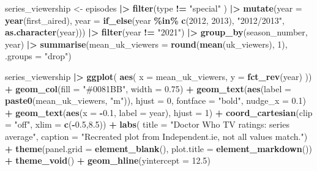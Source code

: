 \documentclass[
]{article}
\newenvironment{Shaded}{\begin{snugshade}}{\end{snugshade}}
\newcommand{\AttributeTok}[1]{\textcolor[rgb]{0.13,0.29,0.53}{#1}}
\newcommand{\DecValTok}[1]{\textcolor[rgb]{0.00,0.00,0.81}{#1}}
\newcommand{\FloatTok}[1]{\textcolor[rgb]{0.00,0.00,0.81}{#1}}
\newcommand{\FunctionTok}[1]{\textcolor[rgb]{0.13,0.29,0.53}{\textbf{#1}}}
\newcommand{\NormalTok}[1]{#1}
\newcommand{\OtherTok}[1]{\textcolor[rgb]{0.56,0.35,0.01}{#1}}
\newcommand{\SpecialCharTok}[1]{\textcolor[rgb]{0.81,0.36,0.00}{\textbf{#1}}}
\newcommand{\StringTok}[1]{\textcolor[rgb]{0.31,0.60,0.02}{#1}}
\begin{document}
\begin{Shaded}
\begin{Highlighting}[]
\NormalTok{series\_viewership }\OtherTok{\textless{}{-}}\NormalTok{ episodes }\SpecialCharTok{|\textgreater{}}
  \FunctionTok{filter}\NormalTok{(type }\SpecialCharTok{!=} \StringTok{"special"}\NormalTok{ ) }\SpecialCharTok{|\textgreater{}}
  \FunctionTok{mutate}\NormalTok{(}\AttributeTok{year =} \FunctionTok{year}\NormalTok{(first\_aired), }
         \AttributeTok{year =} \FunctionTok{if\_else}\NormalTok{(year }\SpecialCharTok{\%in\%} \FunctionTok{c}\NormalTok{(}\DecValTok{2012}\NormalTok{, }\DecValTok{2013}\NormalTok{), }\StringTok{"2012/2013"}\NormalTok{, }
                        \FunctionTok{as.character}\NormalTok{(year))) }\SpecialCharTok{|\textgreater{}}
  \FunctionTok{filter}\NormalTok{(year }\SpecialCharTok{!=} \StringTok{"2021"}\NormalTok{) }\SpecialCharTok{|\textgreater{}}
  \FunctionTok{group\_by}\NormalTok{(season\_number, year) }\SpecialCharTok{|\textgreater{}}
  \FunctionTok{summarise}\NormalTok{(}\AttributeTok{mean\_uk\_viewers =} \FunctionTok{round}\NormalTok{(}\FunctionTok{mean}\NormalTok{(uk\_viewers), }\DecValTok{1}\NormalTok{), }\AttributeTok{.groups =} \StringTok{"drop"}\NormalTok{) }

\NormalTok{series\_viewership }\SpecialCharTok{|\textgreater{}}
  \FunctionTok{ggplot}\NormalTok{(}
    \FunctionTok{aes}\NormalTok{(}
      \AttributeTok{x =}\NormalTok{ mean\_uk\_viewers, }\AttributeTok{y =} \FunctionTok{fct\_rev}\NormalTok{(year)}
\NormalTok{    )) }\SpecialCharTok{+} 
  \FunctionTok{geom\_col}\NormalTok{(}\AttributeTok{fill =} \StringTok{"\#0081BB"}\NormalTok{, }\AttributeTok{width =} \FloatTok{0.75}\NormalTok{) }\SpecialCharTok{+} 
  \FunctionTok{geom\_text}\NormalTok{(}\FunctionTok{aes}\NormalTok{(}\AttributeTok{label =} \FunctionTok{paste0}\NormalTok{(mean\_uk\_viewers, }\StringTok{"m"}\NormalTok{)), }\AttributeTok{hjust =} \DecValTok{0}\NormalTok{, }\AttributeTok{fontface =} \StringTok{"bold"}\NormalTok{, }\AttributeTok{nudge\_x =} \FloatTok{0.1}\NormalTok{) }\SpecialCharTok{+} 
  \FunctionTok{geom\_text}\NormalTok{(}\FunctionTok{aes}\NormalTok{(}\AttributeTok{x =} \SpecialCharTok{{-}}\FloatTok{0.1}\NormalTok{, }\AttributeTok{label =}\NormalTok{ year), }\AttributeTok{hjust =} \DecValTok{1}\NormalTok{) }\SpecialCharTok{+} 
  \FunctionTok{coord\_cartesian}\NormalTok{(}\AttributeTok{clip =} \StringTok{"off"}\NormalTok{, }\AttributeTok{xlim =} \FunctionTok{c}\NormalTok{(}\SpecialCharTok{{-}}\FloatTok{0.5}\NormalTok{,}\FloatTok{8.5}\NormalTok{)) }\SpecialCharTok{+} 
  \FunctionTok{labs}\NormalTok{(}
    \AttributeTok{title =} \StringTok{"Doctor Who TV ratings: series average"}\NormalTok{, }
    \AttributeTok{caption =} \StringTok{"Recreated plot from Independent.ie, not all values match."}\NormalTok{) }\SpecialCharTok{+} 
  \FunctionTok{theme}\NormalTok{(}\AttributeTok{panel.grid =} \FunctionTok{element\_blank}\NormalTok{(), }
        \AttributeTok{plot.title =} \FunctionTok{element\_markdown}\NormalTok{()) }\SpecialCharTok{+}
  \FunctionTok{theme\_void}\NormalTok{() }\SpecialCharTok{+} 
  \FunctionTok{geom\_hline}\NormalTok{(}\AttributeTok{yintercept =} \FloatTok{12.5}\NormalTok{)}
\end{Highlighting}
\end{Shaded}
\end{document}
